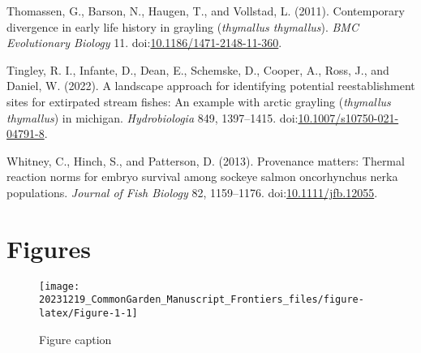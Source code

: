 \documentclass[utf8]{frontiersSCNS}
\newlength{\cslhangindent}
\newlength{\cslentryspacingunit} %
\newenvironment{CSLReferences}[2] %
 {%
  \setlength{\parindent}{0pt}
  \ifodd #1
  \let\oldpar\par
  \def\par{\hangindent=\cslhangindent\oldpar}
  \fi
  \setlength{\parskip}{#2\cslentryspacingunit}
 }%
 {}
\begin{document}
\begin{CSLReferences}{1}{0}
\leavevmode{}%
Thomassen, G., Barson, N., Haugen, T., and Vollstad, L. (2011).
Contemporary divergence in early life history in grayling
(\emph{thymallus thymallus}). \emph{BMC Evolutionary Biology} 11.
doi:\href{https://doi.org/10.1186/1471-2148-11-360}{10.1186/1471-2148-11-360}.

\leavevmode{}%
Tingley, R. I., Infante, D., Dean, E., Schemske, D., Cooper, A., Ross,
J., and Daniel, W. (2022). A landscape approach for identifying
potential reestablishment sites for extirpated stream fishes: An example
with arctic grayling (\emph{thymallus thymallus}) in michigan.
\emph{Hydrobiologia} 849, 1397--1415.
doi:\href{https://doi.org/10.1007/s10750-021-04791-8}{10.1007/s10750-021-04791-8}.

\leavevmode{}%
Whitney, C., Hinch, S., and Patterson, D. (2013). Provenance matters:
Thermal reaction norms for embryo survival among sockeye salmon
oncorhynchus nerka populations. \emph{Journal of Fish Biology} 82,
1159--1176.
doi:\href{https://doi.org/10.1111/jfb.12055}{10.1111/jfb.12055}.

\end{CSLReferences}

\hypertarget{figures}{%
\section*{Figures}\label{figures}}

\begin{figure}

{\centering \texttt{[image: 20231219\_CommonGarden\_Manuscript\_Frontiers\_files/figure-latex/Figure-1-1]} 

}

\caption{Figure caption}\label{fig:Figure-1}
\end{figure}
\end{document}
